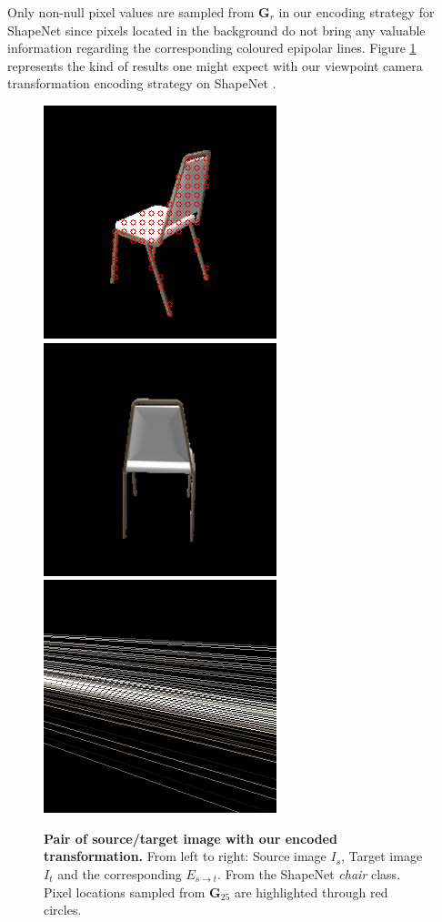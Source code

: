 Only non-null pixel values are sampled from $\textbf{G}_{r}$ in our encoding strategy for ShapeNet \citep{chang2015shapenet} since pixels located in the background do not bring any valuable information regarding the corresponding coloured epipolar lines. Figure \ref{fig:examplePoseEncoded} represents the kind of results one might expect with our viewpoint camera transformation encoding strategy on ShapeNet \citep{chang2015shapenet}. 
\begin{figure}[h!]

\begin{center}
\includegraphics[width=.26\textwidth]{images/epipolarnvs/Is_ECML.png}\hspace{.5cm}%
\includegraphics[width=.26\textwidth]{images/epipolarnvs/It_ECML.png}\hspace{.5cm}%
\includegraphics[width=.26\textwidth]{images/epipolarnvs/Est_ECML.jpg}
\end{center}
\caption{\textbf{Pair of source/target image with our encoded transformation.} From left to right: Source image $I_s$, Target image $I_t$ and the corresponding $E_{s\xrightarrow{}t}$. From the ShapeNet \citep{chang2015shapenet} \textit{chair} class. Pixel locations sampled from $\textbf{G}_{25}$ are highlighted through red circles.}
\label{fig:examplePoseEncoded}
\end{figure}



